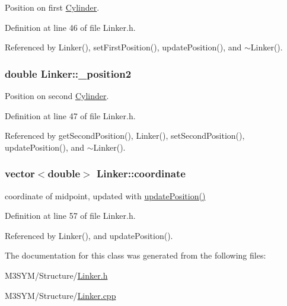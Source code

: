 Position on first \hyperlink{classCylinder}{Cylinder}. 



Definition at line 46 of file Linker.\+h.



Referenced by Linker(), set\+First\+Position(), update\+Position(), and $\sim$\+Linker().

\hypertarget{classLinker_a1efe8ae37a4b70b843c0d7f2dfa47b90}{
\subsubsection[{\+\_\+position2}]{\setlength{\rightskip}{0pt plus 5cm}double Linker\+::\+\_\+position2\hspace{0.3cm}{\ttfamily [private]}}}\label{classLinker_a1efe8ae37a4b70b843c0d7f2dfa47b90}


Position on second \hyperlink{classCylinder}{Cylinder}. 



Definition at line 47 of file Linker.\+h.



Referenced by get\+Second\+Position(), Linker(), set\+Second\+Position(), update\+Position(), and $\sim$\+Linker().

\hypertarget{classLinker_a224aa9b2a6f8f565aef4deae0fe299ce}{
\subsubsection[{coordinate}]{\setlength{\rightskip}{0pt plus 5cm}vector$<$double$>$ Linker\+::coordinate}}\label{classLinker_a224aa9b2a6f8f565aef4deae0fe299ce}


coordinate of midpoint, updated with \hyperlink{classLinker_aa268869b1ed75f38973aafd1362a5c42}{update\+Position()} 



Definition at line 57 of file Linker.\+h.



Referenced by Linker(), and update\+Position().



The documentation for this class was generated from the following files\+:\begin{DoxyCompactItemize}
\item 
M3\+S\+Y\+M/\+Structure/\hyperlink{Linker_8h}{Linker.\+h}\item 
M3\+S\+Y\+M/\+Structure/\hyperlink{Linker_8cpp}{Linker.\+cpp}\end{DoxyCompactItemize}
